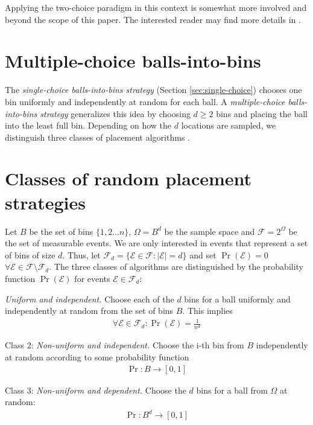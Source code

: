 \documentclass[a4paper,12pt]{article}
\begin{document}
Applying the two-choice paradigm in this context is somewhat more involved and beyond the scope of this paper. The interested reader may find more details in \cite{CMM+98}.

\section{Multiple-choice balls-into-bins}
\label{sec:multiple-choice}
The \emph{single-choice balls-into-bins strategy} (Section \ref{sec:single-choice}) chooses one bin uniformly and independently at random for each ball. A \emph{multiple-choice balls-into-bins strategy} generalizes this idea by  choosing $d \geq 2$ bins and placing the ball into the least full bin. Depending on how the $d$ locations are sampled, we distinguish three classes of placement algorithms \cite{VOC03}. 

\section{Classes of random placement strategies}
\label{sec:classesOfPlacement}
Let $B$ be the set of bins $\{1,2...n\}$, $\Omega = B^{d}$ be the sample space and $\mathcal{F} = 2^{\Omega}$ be the set of measurable events. We are only interested in events that represent a set of bins of size $d$. Thus, let $\mathcal{F}_d = \{\mathcal{E} \in \mathcal{F}: \left\vert \mathcal{E} \right\vert = d\}$ and set $\Pr\left(\mathcal{E}  \right) = 0$  $\forall \mathcal{E} \in \mathcal{F} \setminus \mathcal{F}_d $. The three classes of algorithms are distinguished by the probability function $\Pr\left(\mathcal{E}\right)$ for events $\mathcal{E} \in \mathcal{F}_d$:
\begin{compactitem}
\item  \emph{Uniform and independent.} Choose each of the $d$ bins for a ball uniformly and independently at random from the set of bins $B$. This implies 
\begin{align}
\forall \mathcal{E} \in \mathcal{F}_d: \Pr\left(\mathcal{E}\right) = \frac{1}{n ^{d}}
\end{align}
\item Class 2: \emph{Non-uniform and independent.} Choose the i-th bin from $B$ independently at random according to some probability function
\begin{align}
\Pr: B \rightarrow \left[0,1\right]
\end{align}

\item Class 3: \emph{Non-uniform and dependent.} Choose the $d$ bins for a ball from $\Omega$ at random:
\begin{align}
\Pr: B^{d} \rightarrow \left[0,1\right]
\end{align}
\end{compactitem} 
 
\end{document}
